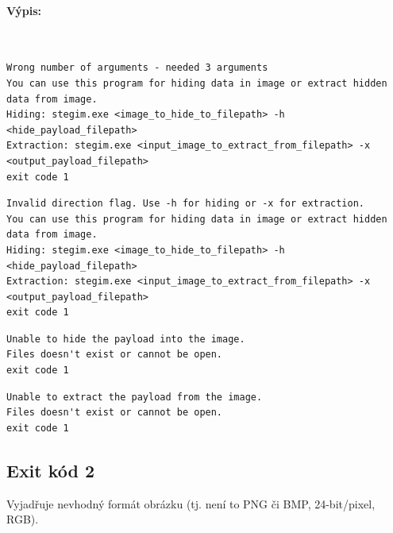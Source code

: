 \documentclass[12pt]{report}
\begin{document}
    \paragraph{Výpis:}\\

    \begin{mdframed}
        \begin{verbatim}
Wrong number of arguments - needed 3 arguments
You can use this program for hiding data in image or extract hidden data from image.
Hiding: stegim.exe <image_to_hide_to_filepath> -h <hide_payload_filepath>
Extraction: stegim.exe <input_image_to_extract_from_filepath> -x <output_payload_filepath>
exit code 1
        \end{verbatim}
    \end{mdframed}

    \begin{mdframed}
        \begin{verbatim}
Invalid direction flag. Use -h for hiding or -x for extraction.
You can use this program for hiding data in image or extract hidden data from image.
Hiding: stegim.exe <image_to_hide_to_filepath> -h <hide_payload_filepath>
Extraction: stegim.exe <input_image_to_extract_from_filepath> -x <output_payload_filepath>
exit code 1
        \end{verbatim}
    \end{mdframed}

    \begin{mdframed}
        \begin{verbatim}
Unable to hide the payload into the image.
Files doesn't exist or cannot be open.
exit code 1
        \end{verbatim}
    \end{mdframed}

    \begin{mdframed}
        \begin{verbatim}
Unable to extract the payload from the image.
Files doesn't exist or cannot be open.
exit code 1
        \end{verbatim}
    \end{mdframed}

    \subsection{Exit kód 2}
    Vyjadřuje nevhodný formát obrázku (tj. není to PNG či BMP, 24-bit/pixel,
    RGB).\\
\end{document}
